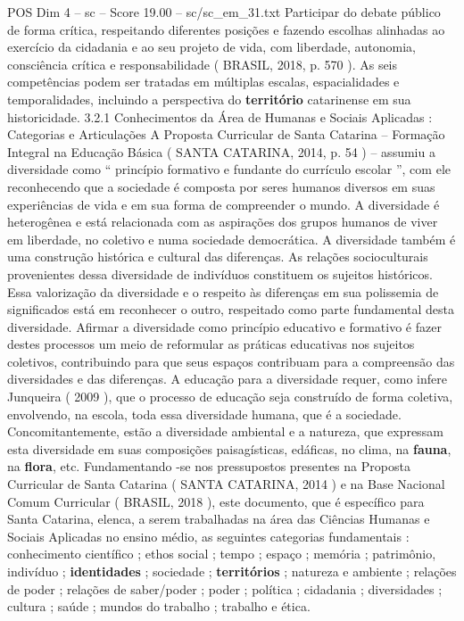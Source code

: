 \begin{textsample}{POS Dim 4 – sc – Score 19.00 – sc/sc\_em\_31.txt}
Participar do debate público de forma crítica, respeitando diferentes posições e fazendo escolhas alinhadas ao exercício da cidadania e ao seu projeto de vida, com liberdade, autonomia, consciência crítica e responsabilidade ( BRASIL, 2018, p. 570 ).
As seis competências podem ser tratadas em múltiplas escalas, espacialidades e temporalidades, incluindo a perspectiva do \textbf{território} catarinense em sua historicidade. 3.2.1 Conhecimentos da Área de Humanas e Sociais Aplicadas : Categorias e Articulações A Proposta Curricular de Santa Catarina – Formação Integral na Educação Básica ( SANTA CATARINA, 2014, p. 54 ) – assumiu a diversidade como “ princípio formativo e fundante do currículo escolar ”, com ele reconhecendo que a sociedade é composta por seres humanos diversos em suas experiências de vida e em sua forma de compreender o mundo.
A diversidade é heterogênea e está relacionada com as aspirações dos grupos humanos de viver em liberdade, no coletivo e numa sociedade democrática.
A diversidade também é uma construção histórica e cultural das diferenças.
As relações socioculturais provenientes dessa diversidade de indivíduos constituem os sujeitos históricos.
Essa valorização da diversidade e o respeito às diferenças em sua polissemia de significados está em reconhecer o outro, respeitado como parte fundamental desta diversidade.
Afirmar a diversidade como princípio educativo e formativo é fazer destes processos um meio de reformular as práticas educativas nos sujeitos coletivos, contribuindo para que seus espaços contribuam para a compreensão das diversidades e das diferenças.
A educação para a diversidade requer, como infere Junqueira ( 2009 ), que o processo de educação seja construído de forma coletiva, envolvendo, na escola, toda essa diversidade humana, que é a sociedade.
Concomitantemente, estão a diversidade ambiental e a natureza, que expressam esta diversidade em suas composições paisagísticas, edáficas, no clima, na \textbf{fauna}, na \textbf{flora}, etc.
Fundamentando -se nos pressupostos presentes na Proposta Curricular de Santa Catarina ( SANTA CATARINA, 2014 ) e na Base Nacional Comum Curricular ( BRASIL, 2018 ), este documento, que é específico para Santa Catarina, elenca, a serem trabalhadas na área das Ciências Humanas e Sociais Aplicadas no ensino médio, as seguintes categorias fundamentais : conhecimento científico ; ethos social ; tempo ; espaço ; memória ; patrimônio, indivíduo ; \textbf{identidades} ; sociedade ; \textbf{territórios} ; natureza e ambiente ; relações de poder ; relações de saber/poder ; poder ; política ; cidadania ; diversidades ; cultura ; saúde ; mundos do trabalho ; trabalho e ética.

\end{textsample}
